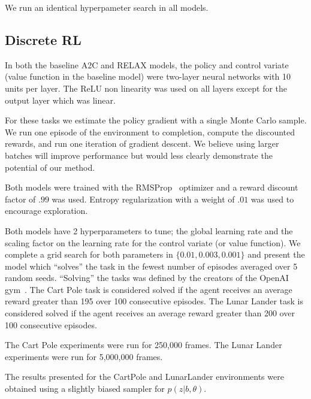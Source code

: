 \documentclass{article}
\begin{document}
We run an identical hyperpameter search in all models. 


\subsection{Discrete RL}
In both the baseline A2C and RELAX models, the policy and control variate (value function in the baseline model) were two-layer neural networks with 10 units per layer.
The ReLU non linearity was used on all layers except for the output layer which was linear.

For these tasks we estimate the policy gradient with a single Monte Carlo sample.
We run one episode of the environment to completion, compute the discounted rewards, and run one iteration of gradient descent.
We believe using larger batches will improve performance but would less clearly demonstrate the potential of our method. 


Both models were trained with the RMSProp~\citep{Tieleman2012} optimizer and a reward discount factor of $.99$ was used. Entropy regularization with a weight of $.01$ was used to  encourage exploration. 

Both models have 2 hyperparameters to tune; the global learning rate and the scaling factor on the learning rate for the control variate (or value function).
We complete a grid search for both parameters in $\{0.01, 0.003, 0.001\}$ and present the model which ``solves'' the task in the fewest number of episodes averaged over 5 random seeds.
``Solving'' the tasks was defined by the creators of the OpenAI gym~\citep{1606.01540}.
The Cart Pole task is considered solved if the agent receives an average reward greater than 195 over 100 consecutive episodes.
The Lunar Lander task is considered solved if the agent receives an average reward greater than 200 over 100 consecutive episodes. 

The Cart Pole experiments were run for 250,000 frames.
The Lunar Lander experiments were run for 5,000,000 frames. 

The results presented for the CartPole and LunarLander environments were obtained using a slightly biased sampler for $p(z|b, \theta)$.
\end{document}

